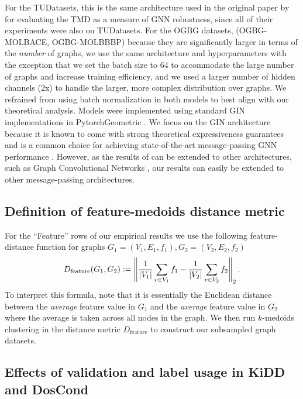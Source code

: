 For the TUDatasets, this is the same architecture used in the original paper by \citet{Chuang22:Tree} for evaluating the TMD as a measure of GNN robustness, since all of their experiments were also on TUDatasets. For the OGBG datasets, (OGBG-MOLBACE, OGBG-MOLBBBP) because they are significantly larger in terms of the \emph{number} of graphs, we use the same architecture and hyperparameters with the exception that we set the batch size to 64 to accommodate the large number of graphs and increase training efficiency, and we used a larger number of hidden channels (2x) to handle the larger, more complex distribution over graphs. We refrained from using batch normalization in both models to best align with our theoretical analysis. Models were implemented using standard GIN implementations in PytorchGeometric \citep{fey2019fast}. We focus on the GIN architecture because it is known to come with strong theoretical expressiveness guarantees and is a common choice for achieving state-of-the-art message-passing GNN performance \citep{xu19gin}. However, as the results of \citet{Chuang22:Tree} can be extended to other architectures, such as Graph Convolutional Networks \citep{kipf2016semi}, our results can easily be extended to other message-passing architectures. 

\subsection{Definition of feature-medoids distance metric}\label{sec:additional-background-experiments-feature}

For the ``Feature'' rows of our empirical results we use the following feature-distance function for graphs $G_1 = (V_1, E_1, f_1), G_2 = (V_2, E_2, f_2)$
\begin{align*}
    D_{\mathrm{feature}}(G_1, G_2) \mathrel{\mathop:}= \left\lVert\frac{1}{\left\lvert V_1\right\rvert} \sum_{v \in V_1} f_1 - \frac{1}{\left\lvert V_2\right\rvert}\sum_{v \in V_2} f_2\right\rVert_2. 
\end{align*}
To interpret this formula, note that it is essentially the Euclidean distance between the \emph{average} feature value in $G_1$ and the \emph{average} feature value in $G_2$ where the average is taken across all nodes in the graph. We then run $k$-medoids clustering in the distance metric $D_\mathrm{feature}$ to construct our subsampled graph datasets. 






\subsection{Effects of validation and label usage in KiDD and DosCond}\label{sec:additional-background-experiments-vallabel}

